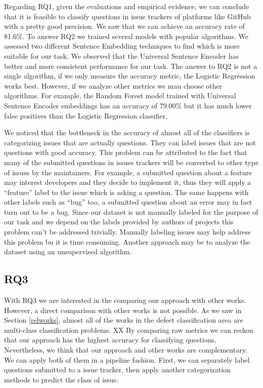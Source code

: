 \documentclass[conference]{IEEEtran}
\begin{document}
Regarding RQ1, given the evaluations and empirical evidence, we can conclude that it is feasible to classify 
questions in issue trackers of platforms like GitHub with a pretty good precision. We saw that we can achieve 
an accuracy rate of 81.6\%. To answer RQ2 we trained several models with popular algorithms. We assessed two
different Sentence Embedding techniques to find which is more suitable for our task. We observed that the 
Universal Sentence Encoder has better and more consistent performance for our task. The answer to RQ2 is not a 
single algorithm, if we only measure the accuracy metric, the Logistic Regression works best. However, if we
analyze other metrics we mau choose other algorithms. For example, the Random Forest model trained with
Universal Sentence Encoder embeddings has an accuracy of 79.00\% but it has much lower false positives than the 
Logistic Regression classifier.

We noticed that the bottleneck in the accuracy of almost all of the classifiers is categorizing issues that are 
actually questions. They can label issues that are not questions with good accuracy. This problem can be attributed 
to the fact that many of the submitted questions in issues trackers will be converted to other type of issues by 
the maintainers. For example, a submitted question about a feature may interest developers and they decide to 
implement it, thus they will apply a ``feature'' label to the issue which is asking a question. 
The same happens with other labels such as ``bug'' too, a submitted question about an error 
may in fact turn out to be a bug. Since our dataset is not manually labeled for the purpose of our task and we 
depend on the labels provided by authors of projects this problem can't be addressed trivially. 
Manually labeling issues may help address this problem bu it is time consuming. Another approach may be to analyze 
the dataset using an unsupervised algorithm.

\subsection{RQ3}
With RQ3 we are interested in the comparing our approach with other works. However, a direct comparison with other 
works is not possible. As we saw in Section \ref{relworks}, almost all of the works in the defect classification area 
are multi-class classification problems. XX By comparing raw metrics we can reckon that our approach has the highest 
accuracy for classifying questions. Nevertheless, we think that our approach and other works are complementary.
We can apply both of them in a pipeline fashion. First, we can separately label questions submitted to a 
issue tracker, then apply another categorization methods to predict the class of issue.
\end{document}
